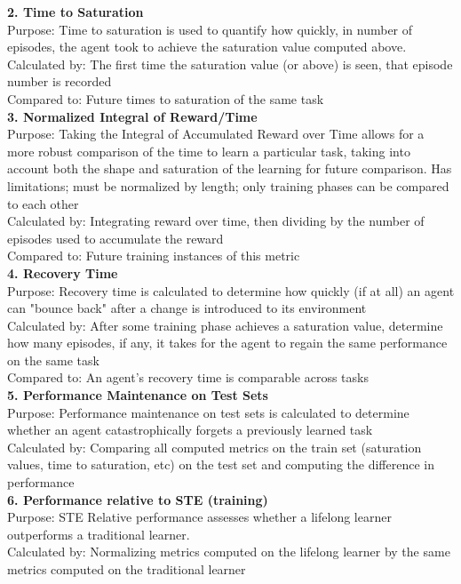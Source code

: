\textbf{2. Time to Saturation}\\
Purpose: Time to saturation is used to quantify how quickly, in number of episodes, the agent took to achieve the saturation value computed above.\\
Calculated by: The first time the saturation value (or above) is seen, that episode number is recorded\\
Compared to: Future times to saturation of the same task\\[0.1in]


\textbf{3. Normalized Integral of Reward/Time}\\
Purpose: Taking the Integral of Accumulated Reward over Time allows for a more robust comparison of the time to learn a particular task, taking into account both the shape and saturation of the learning for future comparison. Has limitations; must be normalized by length; only training phases can be compared to each other \\
Calculated by: Integrating reward over time, then dividing by the number of episodes used to accumulate the reward\\
Compared to: Future training instances of this metric\\[0.1in]


\textbf{4. Recovery Time}\\
Purpose: Recovery time is calculated to determine how quickly (if at all) an agent can "bounce back" after a change is introduced to its environment\\
Calculated by: After some training phase achieves a saturation value, determine how many episodes, if any, it takes for the agent to regain the same performance on the same task\\
Compared to: An agent's recovery time is comparable across tasks\\[0.1in]


\textbf{5. Performance Maintenance on Test Sets}\\
Purpose: Performance maintenance on test sets is calculated to determine whether an agent catastrophically forgets a previously learned task\\
Calculated by: Comparing all computed metrics on the train set (saturation values, time to saturation, etc) on the test set and computing the difference in performance\\[0.1in]


\textbf{6. Performance relative to STE (training)}\\
Purpose: STE Relative performance assesses whether a lifelong learner outperforms a traditional learner.\\
Calculated by: Normalizing metrics computed on the lifelong learner by the same metrics computed on the traditional learner\\
